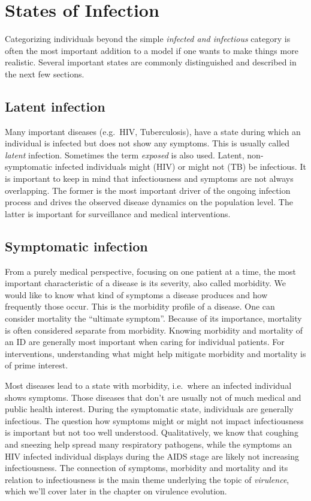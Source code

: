 \documentclass[]{book}
\theoremstyle{definition}
\theoremstyle{definition}
\theoremstyle{definition}
\theoremstyle{remark}
\begin{document}
\hypertarget{states-of-infection}{%
\section{States of Infection}\label{states-of-infection}}

Categorizing individuals beyond the simple \emph{infected and
infectious} category is often the most important addition to a model if
one wants to make things more realistic. Several important states are
commonly distinguished and described in the next few sections.

\hypertarget{latent-infection}{%
\subsection{Latent infection}\label{latent-infection}}

Many important diseases (e.g.~HIV, Tuberculosis), have a state during
which an individual is infected but does not show any symptoms. This is
usually called \emph{latent} infection. Sometimes the term
\emph{exposed} is also used. Latent, non-symptomatic infected
individuals might (HIV) or might not (TB) be infectious. It is important
to keep in mind that infectiousness and symptoms are not always
overlapping. The former is the most important driver of the ongoing
infection process and drives the observed disease dynamics on the
population level. The latter is important for surveillance and medical
interventions.

\hypertarget{symptomatic-infection}{%
\subsection{Symptomatic infection}\label{symptomatic-infection}}

From a purely medical perspective, focusing on one patient at a time,
the most important characteristic of a disease is its severity, also
called morbidity. We would like to know what kind of symptoms a disease
produces and how frequently those occur. This is the morbidity profile
of a disease. One can consider mortality the ``ultimate symptom''.
Because of its importance, mortality is often considered separate from
morbidity. Knowing morbidity and mortality of an ID are generally most
important when caring for individual patients. For interventions,
understanding what might help mitigate morbidity and mortality is of
prime interest.

Most diseases lead to a state with morbidity, i.e.~where an infected
individual shows symptoms. Those diseases that don't are usually not of
much medical and public health interest. During the symptomatic state,
individuals are generally infectious. The question how symptoms might or
might not impact infectiousness is important but not too well
understood. Qualitatively, we know that coughing and sneezing help
spread many respiratory pathogens, while the symptoms an HIV infected
individual displays during the AIDS stage are likely not increasing
infectiousness. The connection of symptoms, morbidity and mortality and
its relation to infectiousness is the main theme underlying the topic of
\emph{virulence}, which we'll cover later in the chapter on virulence
evolution.
\end{document}
